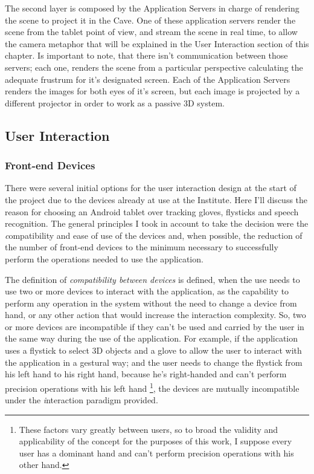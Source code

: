 The second layer is composed by the Application Servers in charge of rendering the scene to project it in the Cave. One of these application servers render the scene from the tablet point of view, and stream the scene in real time, to allow the camera metaphor that will be explained in the User Interaction section of this chapter. Is important to note, that there isn't communication between those servers; each one, renders the scene from a particular perspective calculating the adequate frustrum for it's designated screen. Each of the Application Servers renders the images for both eyes of it's screen, but each image is projected by a different projector in order to work as a passive 3D system.
\subsection{User Interaction}

\subsubsection{Front-end Devices}
There were several initial options for the user interaction design at the start of the project due to the devices already at use at the Institute. Here I'll discuss the reason for choosing an Android tablet over tracking gloves, flysticks and speech recognition. The general principles I took in account to take the decision were the {\emph compatibility} and ease of use of the devices and, when possible, the reduction of the number of front-end devices to the minimum necessary to successfully perform the operations needed to use the application.

The definition of \emph{compatibility between devices} is defined, when the use needs to use two or more devices to interact with the application, as the capability to perform any operation in the system without the need to change a device from hand, or any other action that would increase the interaction complexity. So, two or more devices are incompatible if they can't be used and carried by the user in the same way during the use of the application. For example, if the application uses a flystick to select 3D objects and a glove to allow the user to interact with the application in a gestural way; and the user needs to change the flystick from his left hand to his right hand, because he's right-handed and can't perform precision operations with his left hand \footnote{These factors vary greatly between users, so to broad the validity and applicability of the concept for the purposes of this work, I suppose every user has a dominant hand and can't perform precision operations with his other hand.}, the devices are mutually incompatible under the {\emph interaction paradigm} provided.

